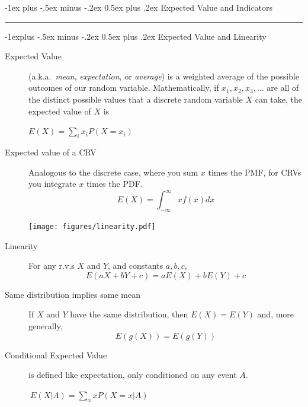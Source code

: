 \documentclass[10pt,landscape]{article}
\makeatletter
\renewcommand{\section}{\@startsection{section}{1}{0mm}%
                                {-1ex plus -.5ex minus -.2ex}%
                                {0.5ex plus .2ex}%
                                {\normalfont\large\bfseries}}
\renewcommand{\subsection}{\@startsection{subsection}{2}{0mm}%
                                {-1explus -.5ex minus -.2ex}%
                                {0.5ex plus .2ex}%
                                {\normalfont\normalsize\bfseries}}
\makeatother
\begin{document}
\begin{multicols*}{3}
\begin{description}
\end{description}

\section{Expected Value and Indicators}\smallskip \hrule height 2pt \smallskip


\subsection{Expected Value and Linearity}
\begin{description}
\item[Expected Value] (a.k.a.~\emph{mean}, \emph{expectation}, or \emph{average}) is a weighted average of the possible outcomes of our random variable. Mathematically, if $x_1, x_2, x_3, \dots$ are all of the distinct possible values that a discrete random variable $X$ can take, the expected value of $X$ is
\begin{center}
$E(X) = \sum\limits_{i}x_iP(X=x_i)$
\end{center}

\item[Expected value of a CRV] Analogous to the discrete case, where you sum $x$ times the PMF, for CRVs you integrate $x$ times the PDF.
  \[E(X) = \int^\infty_{-\infty}xf(x)dx \]

  \begin{minipage}{\linewidth}
              \centering
  \texttt{[image: figures/linearity.pdf]}
  \end{minipage}

\item[Linearity] For any r.v.s $X$ and $Y$, and constants $a,b,c,$
\[E(aX + bY + c) = aE(X) + bE(Y) + c \]

\item[Same distribution implies same mean] If $X$ and $Y$ have the same distribution, then $E(X)=E(Y)$ and, more generally,
$$E(g(X)) = E(g(Y))$$


\item[Conditional Expected Value] is defined like expectation, only conditioned on any event $A$. \begin{center}
$\ E(X | A) = \sum\limits_{x}xP(X=x | A)$
\end{center}


\end{description}
\end{multicols*}
\end{document}
